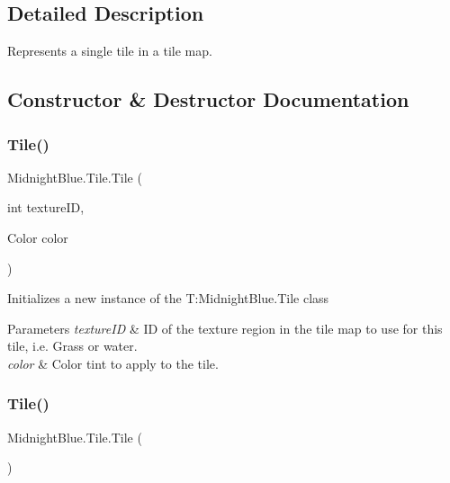\subsection{Detailed Description}
Represents a single tile in a tile map. 



\subsection{Constructor \& Destructor Documentation}
\hypertarget{class_midnight_blue_1_1_tile_a4e0e9f97acbb22eb1d54945b44d52e7b}{}\label{class_midnight_blue_1_1_tile_a4e0e9f97acbb22eb1d54945b44d52e7b} 
\subsubsection{\texorpdfstring{Tile()}{Tile()}\hspace{0.1cm}{\footnotesize\ttfamily [1/2]}}
{\footnotesize\ttfamily Midnight\+Blue.\+Tile.\+Tile (\begin{DoxyParamCaption}\item[{int}]{texture\+ID,  }\item[{Color}]{color }\end{DoxyParamCaption})\hspace{0.3cm}{\ttfamily [inline]}}



Initializes a new instance of the T\+:\+Midnight\+Blue.\+Tile class 


\begin{DoxyParams}{Parameters}
{\em texture\+ID} & ID of the texture region in the tile map to use for this tile, i.\+e. Grass or water.\\
\hline
{\em color} & Color tint to apply to the tile.\\
\hline
\end{DoxyParams}
\hypertarget{class_midnight_blue_1_1_tile_af89b11fc577df594ffebd0963e9020d4}{}\label{class_midnight_blue_1_1_tile_af89b11fc577df594ffebd0963e9020d4} 
\subsubsection{\texorpdfstring{Tile()}{Tile()}\hspace{0.1cm}{\footnotesize\ttfamily [2/2]}}
{\footnotesize\ttfamily Midnight\+Blue.\+Tile.\+Tile (\begin{DoxyParamCaption}{ }\end{DoxyParamCaption})\hspace{0.3cm}{\ttfamily [inline]}}



